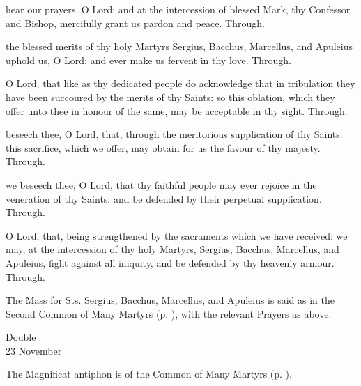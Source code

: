 \collect
{} hear our prayers, O Lord: and at the intercession of blessed Mark, thy Confessor and Bishop, mercifully grant us pardon and peace. Through.

 the blessed merits of thy holy Martyrs Sergius, Bacchus, Marcellus, and Apuleius uphold us, O Lord: and ever make us fervent in thy love. Through.

\secret
{} O Lord, that like as thy dedicated people do acknowledge that in tribulation they have been succoured by the merits of thy Saints: so this oblation, which they offer unto thee in honour of the same, may be acceptable in thy sight. Through.

 beseech thee, O Lord, that, through the meritorious supplication of thy Saints: this sacrifice, which we offer, may obtain for us the favour of thy majesty. Through.

\postcommunion
{} we beseech thee, O Lord, that thy faithful people may ever rejoice in the veneration of thy Saints: and be defended by their perpetual supplication. Through.

 O Lord, that, being strengthened by the sacraments which we have received: we may, at the intercession of thy holy Martyrs, Sergius, Bacchus, Marcellus, and Apuleius, fight against all iniquity, and be defended by thy heavenly armour. Through.

\begin{rubric}
	The Mass for Sts. Sergius, Bacchus, Marcellus, and Apuleius is said as in the Second Common of Many Martyrs (p. \pageref{CommonMartyrsII}), with the relevant Prayers as above.
\end{rubric}





\begin{inhead}
	{Double\\
		23 November}
\end{inhead}


\begin{rubric}
	The Magnificat antiphon is of the Common of Many Martyrs (p. \pageref{CommonMartyrsI}).
\end{rubric}

